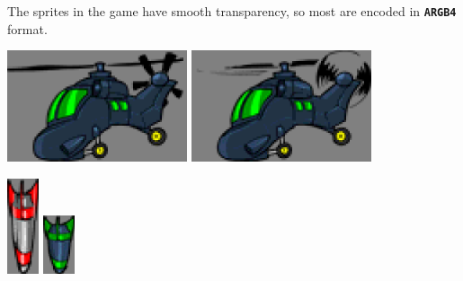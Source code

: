 \documentclass[10pt]{book}
\newcommand{\mach}[1]{\texttt{\textbf{#1}}}
\begin{document}
\newpage

The sprites in the game have smooth transparency, so most are encoded in \mach{ARGB4} format.

\begin{center}
\includegraphics[width=150pt]{previews/nightstrike_1-HELI-00.png}
\includegraphics[width=150pt]{previews/nightstrike_1-HELI-01.png}
\end{center}

\begin{center}
\includegraphics[width=0.07\textwidth]{previews/nightstrike_0-MISSILE_A-00.png}
\includegraphics[width=0.07\textwidth]{previews/nightstrike_0-MISSILE_C-00.png}
\end{center}
\end{document}
